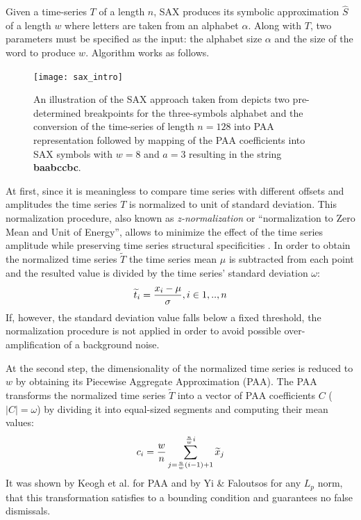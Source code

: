 Given a time-series $T$ of a length $n$, SAX produces its symbolic approximation $\hat{S}$ of a length $w$ where letters are taken 
from an alphabet $\alpha$. Along with $T$, two parameters must be specified as the input: the alphabet size $\alpha$ and the size of 
the word to produce $w$. Algorithm works as follows. 

\begin{figure}[tbp]
   \centering
   \texttt{[image: sax\_intro]}
   \caption{An illustration of the SAX approach taken from \cite{citeulike:2821475} depicts two pre-determined breakpoints for the 
   three-symbols alphabet and the conversion of the time-series of length $n=128$ into PAA representation followed by mapping of 
   the PAA coefficients into SAX symbols with $w=8$ and $a=3$ resulting in the string \textbf{baabccbc}.}
   \label{fig:sax_intro}
\end{figure}

At first, since it is meaningless to compare time series with different offsets and amplitudes \cite{citeulike:532340} the time series 
$T$ is normalized to unit of standard deviation. This normalization procedure, also known as \textit{z-normalization} or 
``normalization to Zero Mean and Unit of Energy'', allows to minimize the effect of the time series amplitude while preserving time 
series structural specificities \cite{citeulike:3815880}. In order to obtain the normalized time series $\widetilde{T}$ the time series 
mean $\mu$ is subtracted from each point and the resulted value is divided by the time series' standard deviation $\omega$:
\begin{equation}
\Large
\widetilde{t}_{i} = \frac{x_{i}-\mu}{\sigma}, i \in {1,..,n}
\label{eq:znorm}
\end{equation}
If, however, the standard deviation value falls below a fixed threshold, the normalization procedure is not applied in order to avoid 
possible over-amplification of a background noise.

At the second step, the dimensionality of the normalized time series is reduced to $w$ by obtaining its 
Piecewise Aggregate Approximation (PAA). The PAA transforms the normalized time series $\widetilde{T}$ into a vector 
of PAA coefficients $C$ ($|C|=\omega$) by dividing it into equal-sized segments and computing their mean values:
\begin{equation}
\Large
c_{i} = \frac{w}{n} \sum_{j=\frac{n}{w}(i-1)+1}^{\frac{n}{w}i} \widetilde{x}_{j}
\label{eq:paa}
\end{equation}
It was shown by Keogh et al. \cite{citeulike:3000416} for PAA and by Yi \& Faloutsos \cite{citeulike:2946589} for any $L_{p}$ norm,
that this transformation satisfies to a bounding condition and guarantees no false dismissals.

